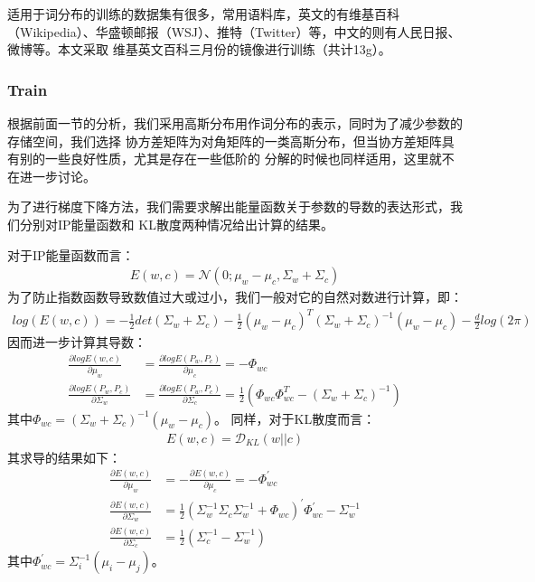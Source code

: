 \documentclass[13pt]{article}
\begin{document}
适用于词分布的训练的数据集有很多，常用语料库，英文的有维基百科（Wikipedia）、华盛顿邮报（WSJ）、推特（Twitter）等，中文的则有人民日报、微博等。本文采取
维基英文百科三月份的镜像进行训练（共计13g）。

\subsubsection{Train}
根据前面一节的分析，我们采用高斯分布用作词分布的表示，同时为了减少参数的存储空间，我们选择
协方差矩阵为对角矩阵的一类高斯分布，但当协方差矩阵具有别的一些良好性质，尤其是存在一些低阶的
分解的时候也同样适用，这里就不在进一步讨论。

为了进行梯度下降方法，我们需要求解出能量函数关于参数的导数的表达形式，我们分别对IP能量函数和
KL散度两种情况给出计算的结果。

对于IP能量函数而言：
\begin{align*}
E(w,c)=\mathcal{N}(0;\mu_w-\mu_c,\Sigma_w+\Sigma_c)
\end{align*}
为了防止指数函数导致数值过大或过小，我们一般对它的自然对数进行计算，即：
\begin{align*}
log(E(w,c)) = -\frac{1}{2}det(\Sigma_w+\Sigma_c) - \frac{1}{2}(\mu_w-\mu_c)^{T}(\Sigma_w+\Sigma_c)^{-1}(\mu_w-\mu_c) - \frac{d}{2}log(2\pi)
\end{align*}
因而进一步计算其导数：
\begin{align*}
\frac{\partial{}logE(w,c)}{\partial{}\mu_w} &=\frac{\partial{}logE(P_w,P_c)}{\partial{}\mu_c}  =-\Phi_{wc}  \\
\frac{\partial{logE(P_w,P_c)}}{\partial{\Sigma_w}}& =\frac{\partial{logE(P_w,P_c)}}{\partial{\Sigma_c}} = \frac{1}{2}(\Phi_{wc} \Phi_{wc}^{T}-(\Sigma_w+\Sigma_c)^{-1})
\end{align*}
其中$\Phi_{wc} = (\Sigma_w+\Sigma_c)^{-1}(\mu_w-\mu_c)$。
同样，对于KL散度而言：
\begin{align*}
E(w,c)=\mathcal{D}_{KL}(w||c)
\end{align*}
其求导的结果如下：
\begin{align*}
\frac{\partial{}E(w,c)}{\partial{}\mu_w} &= - \frac{\partial{}E(w,c)}{\partial{}\mu_c} =  -\Phi_{wc}^{'} \\
\frac{\partial{}E(w,c)}{\partial{}\Sigma_w} &= \frac{1}{2}(\Sigma_w^{-1} \Sigma_{c} \Sigma_{w}^{-1} + \Phi_{wc})^{'}\Phi_{wc}^{'} - \Sigma_w^{-1} \\ 
\frac{\partial{}E(w,c)}{\partial{}\Sigma_c} &= \frac{1}{2}(\Sigma_c^{-1} - \Sigma_{w}^{-1})
\end{align*}
其中$\Phi_{wc}^{'}=\Sigma_{i}^{-1}(\mu_i-\mu_j)$。
\end{document}
